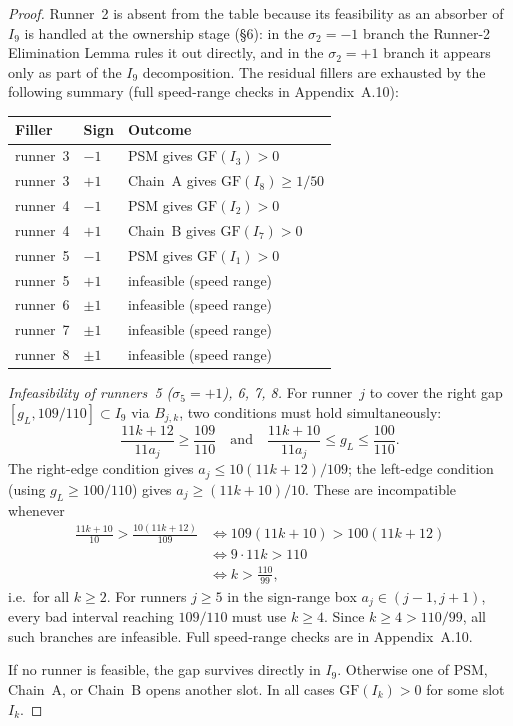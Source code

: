 \documentclass[12pt,a4paper]{amsart}
\theoremstyle{definition}
\theoremstyle{remark}
\newcommand{\GF}{\mathrm{GF}}
\begin{document}
\begin{proof}
Runner~2 is absent from the table because its feasibility as an absorber of $I_9$ is
handled at the ownership stage (§6): in the $\sigma_2=-1$ branch the Runner-2 Elimination
Lemma rules it out directly, and in the $\sigma_2=+1$ branch it appears only as part of
the $I_9$ decomposition. The residual fillers are exhausted by the following summary
(full speed-range checks in Appendix~A.10):

\medskip
\begin{center}
\begin{tabular}{lll}
\toprule
Filler & Sign & Outcome \\
\midrule
runner~3 & $-1$ & PSM gives $\GF(I_3)>0$ \\
runner~3 & $+1$ & Chain~A gives $\GF(I_8)\ge 1/50$ \\
runner~4 & $-1$ & PSM gives $\GF(I_2)>0$ \\
runner~4 & $+1$ & Chain~B gives $\GF(I_7)>0$ \\
runner~5 & $-1$ & PSM gives $\GF(I_1)>0$ \\
runner~5 & $+1$ & infeasible (speed range) \\
runner~6 & $\pm1$ & infeasible (speed range) \\
runner~7 & $\pm1$ & infeasible (speed range) \\
runner~8 & $\pm1$ & infeasible (speed range) \\
\bottomrule
\end{tabular}
\end{center}

\medskip
\textit{Infeasibility of runners~5 ($\sigma_5=+1$), 6, 7, 8.} For runner~$j$ to cover
the right gap $[g_L,109/110]\subset I_9$ via $B_{j,k}$, two conditions must hold
simultaneously:
\[
  \frac{11k+12}{11a_j}\ge\frac{109}{110}\quad\text{and}\quad
  \frac{11k+10}{11a_j}\le g_L \le \frac{100}{110}.
\]
The right-edge condition gives $a_j\le 10(11k+12)/109$; the left-edge condition (using
$g_L\ge 100/110$) gives $a_j\ge(11k+10)/10$. These are incompatible whenever
\begin{align*}
  \frac{11k+10}{10} > \frac{10(11k+12)}{109}
  &\iff 109(11k+10)>100(11k+12) \\
  &\iff 9\cdot 11k > 110 \\
  &\iff k > \frac{110}{99},
\end{align*}
i.e.\ for all $k\ge 2$. For runners $j\ge 5$ in the sign-range box
$a_j\in(j-1,j+1)$, every bad interval reaching $109/110$ must use $k\ge 4$.
Since $k\ge 4>110/99$, all such branches are infeasible. Full speed-range checks are in Appendix~A.10.

If no runner is feasible, the gap survives directly in $I_9$. Otherwise one of PSM,
Chain~A, or Chain~B opens another slot. In all cases $\GF(I_k)>0$ for some slot $I_k$.
\end{proof}
\end{document}
